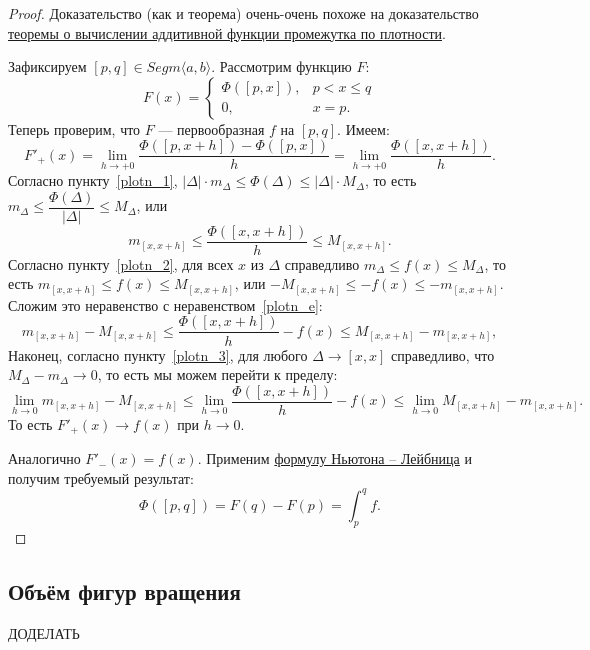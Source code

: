 \begin{proof}
	Доказательство (как и теорема) очень-очень похоже на доказательство \hyperlink{afp}{теоремы о вычислении аддитивной функции промежутка по плотности}.
	
	Зафиксируем \([p, q] \in Segm \langle a, b \rangle\). Рассмотрим функцию \(F\): \[
	F(x) =
	\begin{cases}
		\Phi([p, x]), & p < x \leqslant q \\
		0,			  & x = p.
	\end{cases}
	\]
	Теперь проверим, что \(F\) --- первообразная \(f\) на \([p, q]\). Имеем: \[
	F'_+(x) = \lim_{h \to +0} \frac{\Phi([p, x + h]) - \Phi([p, x])}{h} = \lim_{h \to +0} \frac{\Phi([x, x + h])}{h}.
	\]
	Согласно пункту~\ref{plotn_1}, \(|\Delta| \cdot m_\Delta \leqslant \Phi(\Delta) \leqslant |\Delta| \cdot M_\Delta\), то есть \(m_\Delta \leqslant \dfrac{\Phi(\Delta)}{|\Delta|} \leqslant M_\Delta\), или
	\begin{equation} \label{plotn_e}
		m_{[x, x + h]} \leqslant \frac{\Phi([x, x + h])}{h} \leqslant M_{[x, x + h]}.
	\end{equation}
	Согласно пункту~\ref{plotn_2}, для всех \(x \) из \(\Delta\) справедливо \(m_\Delta \leqslant f(x) \leqslant M_\Delta\), то есть \(m_{[x, x + h]} \leqslant f(x) \leqslant M_{[x, x + h]}\), или \(-M_{[x, x + h]} \leqslant -f(x) \leqslant -m_{[x, x + h]}\). Сложим это неравенство с неравенством~\eqref{plotn_e}: \[
		m_{[x, x + h]} - M_{[x, x + h]} \leqslant \frac{\Phi([x, x + h])}{h} - f(x) \leqslant M_{[x, x + h]} - m_{[x, x + h]},
	\]
	Наконец, согласно пункту~\ref{plotn_3}, для любого \(\Delta \to [x, x]\) справедливо, что \(M_\Delta - m_\Delta \to 0\), то есть мы можем перейти к пределу: \[
		\lim_{h \to 0} m_{[x, x + h]} - M_{[x, x + h]} \leqslant \lim_{h \to 0} \frac{\Phi([x, x + h])}{h} - f(x) \leqslant \lim_{h \to 0} M_{[x, x + h]} - m_{[x, x + h]}.
	\]
	То есть \(F'_+(x) \to  f(x)\) при \(h \to 0\).
	
	Аналогично \(F'_-(x) = f(x)\). Применим \hyperlink{t9}{формулу Ньютона -- Лейбница} и получим требуемый результат: \[
	\Phi([p, q]) = F(q) - F(p) = \int_p^q f.
	\]
\end{proof}

\subsection{Объём фигур вращения}

\begin{theorem}
	ДОДЕЛАТЬ
\end{theorem}

